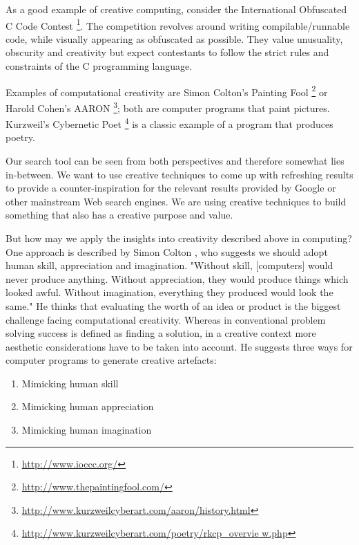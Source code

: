 As a good example of creative computing, consider the International Obfuscated C Code Contest \footnote{\url{http://www.ioccc.org/}}. The competition revolves around writing compilable/runnable code, while visually appearing as obfuscated as possible. They value unusuality, obscurity and creativity but expect contestants to follow the strict rules and constraints of the C programming language.

Examples of computational creativity are Simon Colton's Painting Fool \footnote{\url{http://www.thepaintingfool.com/}} or Harold Cohen's AARON \footnote{\url{http://www.kurzweilcyberart.com/aaron/history.html}}; both are computer programs that paint pictures. Kurzweil's Cybernetic Poet \footnote{\url{http://www.kurzweilcyberart.com/poetry/rkcp_overvie w.php}} is a classic example of a program that produces poetry.

Our search tool can be seen from both perspectives and therefore somewhat lies in-between. We want to use creative techniques to come up with refreshing results to provide a counter-inspiration for the relevant results provided by Google or other mainstream Web search engines. We are using creative techniques to build something that also has a creative purpose and value.

But how may we apply the insights into creativity described above in computing? One approach is described by Simon Colton \citep{Colton2008}, who suggests we should adopt human skill, appreciation and imagination. "Without skill, [computers] would never produce anything. Without appreciation, they would produce things which looked awful. Without imagination, everything they produced would look the same." He thinks that evaluating the worth of an idea or product is the biggest challenge facing computational creativity. Whereas in conventional problem solving success is defined as finding a solution, in a creative context more aesthetic considerations have to be taken into account. He suggests three ways for computer programs to generate creative artefacts:

\begin{enumerate}
  \item Mimicking human skill
  \item Mimicking human appreciation
  \item Mimicking human imagination
\end{enumerate}

